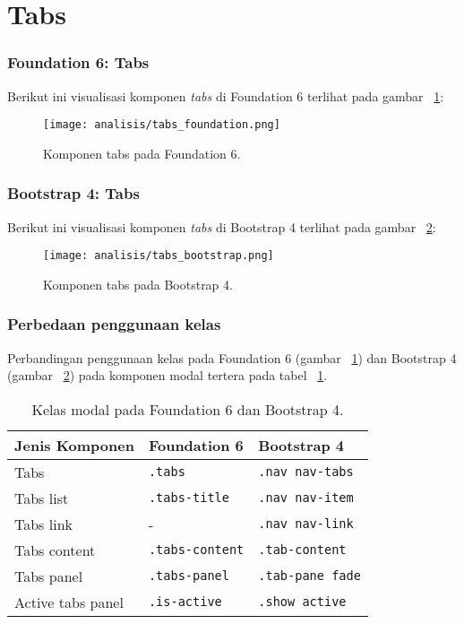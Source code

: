 \section{Tabs}
\subsubsection{Foundation 6: Tabs}
Berikut ini visualisasi komponen \textit{tabs} di Foundation 6 terlihat pada gambar ~\ref{fig:tabsFoundation}:
\begin{figure} [H]	
	\centering
	\texttt{[image: analisis/tabs\_foundation.png]}
	\caption{Komponen tabs pada Foundation 6.}
	\label{fig:tabsFoundation}
\end{figure}

\subsubsection{Bootstrap 4: Tabs}
Berikut ini visualisasi komponen \textit{tabs} di Bootstrap 4 terlihat pada gambar ~\ref{fig:tabsBootstrap}:
\begin{figure} [H]
	\centering
	\texttt{[image: analisis/tabs\_bootstrap.png]}
	\caption{Komponen tabs pada Bootstrap 4.}
	\label{fig:tabsBootstrap}
\end{figure}

\subsubsection{Perbedaan penggunaan kelas}
\noindent Perbandingan penggunaan kelas pada Foundation 6 (gambar ~\ref{fig:tabsFoundation}) dan Bootstrap 4  (gambar ~\ref{fig:tabsBootstrap}) pada komponen modal tertera pada tabel ~\ref{table:tabs}.\\

\begin{table}[H] 
	\caption{Kelas modal pada Foundation 6 dan Bootstrap 4.}
	\begin{tabular}{| p{} | p{} | p{} |} 
		\hline
		\textbf{Jenis Komponen} & \textbf{Foundation 6} & \textbf{Bootstrap 4}  \\ [0.5ex] 
		\hline	
		Tabs & \texttt{.tabs} & \texttt{.nav nav-tabs}\\	
		\hline
		Tabs list & \texttt{.tabs-title} & \texttt{.nav nav-item}\\	
		\hline
		Tabs link & - & \texttt{.nav nav-link}\\[1ex]	
		\hline	
		Tabs content & \texttt{.tabs-content} & \texttt{.tab-content}\\[1ex]	
		\hline			
		Tabs panel & \texttt{.tabs-panel} & \texttt{.tab-pane fade}\\[1ex]	
		\hline
		Active tabs panel & \texttt{.is-active} & \texttt{.show active}\\[1ex]	
		\hline	
	\end{tabular}
	\label{table:tabs}
\end{table}

 
